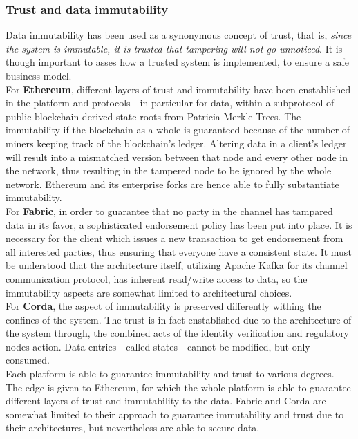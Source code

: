 \subsubsection{Trust and data immutability}
Data immutability has been used as a synonymous concept of trust, that is, \textit{since the system is immutable, it is trusted that tampering will not go unnoticed}. It is though important to asses how a trusted system is implemented, to ensure a safe business model. \\


For \textbf{Ethereum}, different layers of trust and immutability have been enstablished in the platform and protocols - in particular for data, within a subprotocol of public blockchain derived state roots from Patricia Merkle Trees. The immutability if the blockchain as a whole is guaranteed because of the number of miners keeping track of the blockchain's ledger. Altering data in a client's ledger will result into a mismatched version between that node and every other node in the network, thus resulting in the tampered node to be ignored by the whole network.
Ethereum and its enterprise forks are hence able to fully substantiate immutability.\\

For \textbf{Fabric}, in order to guarantee that no party in the channel has tampared data in its favor, a sophisticated endorsement policy has been put into place. It is necessary for the client which issues a new transaction to get endorsement from all interested parties, thus ensuring that everyone have a consistent state. It must be understood that the architecture itself, utilizing Apache Kafka for its channel communication protocol, has inherent read/write access to data, so the immutability aspects are somewhat limited to architectural choices.\\

For \textbf{Corda}, the aspect of immutability is preserved differently withing the confines of the system. The trust is in fact enstablished due to the architecture of the system through, the combined acts of the identity verification and regulatory nodes action. Data entries - called states - cannot be modified, but only consumed.\\

Each platform is able to guarantee immutability and trust to various degrees. The edge is given to Ethereum, for which the whole platform is able to guarantee different layers of trust and immutability to the data. Fabric and Corda are somewhat limited to their approach to guarantee immutability and trust due to their architectures, but nevertheless are able to secure data.



